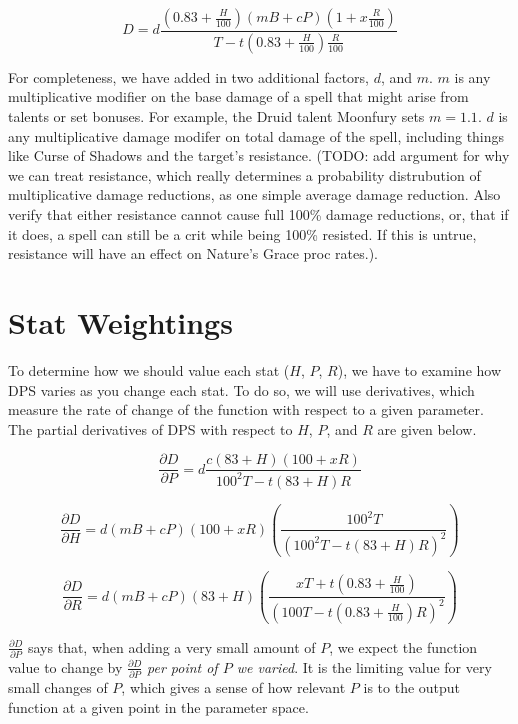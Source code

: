 \documentclass[letterpaper]{article}
\theoremstyle{definition}
\begin{document}
\begin{equation}
D = d\frac{\left(0.83 + \frac{H}{100}\right)\left(mB + cP\right)\left(1 + x\frac{R}{100}\right)}{T - t\left(0.83 + \frac{H}{100}\right)\frac{R}{100}}
\end{equation}

For completeness, we have added in two additional factors, $d$, and $m$. $m$ is any multiplicative modifier on the base damage of a spell that might arise from talents or set bonuses. For example, the Druid talent Moonfury sets $m=1.1$. $d$ is any multiplicative damage modifer on total damage of the spell, including things like Curse of Shadows and the target's resistance. (TODO: add argument for why we can treat resistance, which really determines a probability distrubution of multiplicative damage reductions, as one simple average damage reduction. Also verify that either resistance cannot cause full 100\% damage reductions, or, that if it does, a spell can still be a crit while being 100\% resisted. If this is untrue, resistance will have an effect on Nature's Grace proc rates.).

\section{Stat Weightings}
To determine how we should value each stat ($H$, $P$, $R$), we have to examine how DPS varies as you change each stat. To do so, we will use derivatives, which measure the rate of change of the function with respect to a given parameter. The partial derivatives of DPS with respect to $H$, $P$, and $R$ are given below.

\begin{equation}
\frac{\partial D}{\partial P} = d\frac{c\left(83+H\right)\left(100 + xR\right)}{100^2T - t(83 + H)R}
\end{equation}

\begin{equation}
\frac{\partial D}{\partial H} = d\left(mB + cP\right)\left(100+xR\right) \left(\frac{100^2T}{\left(100^2T - t\left(83+H\right)R\right)^2}\right)
\end{equation}

\begin{equation}
\frac{\partial D}{\partial R} = d\left(mB+cP\right)\left(83+H\right) \left(\frac{xT + t\left(0.83 + \frac{H}{100}\right)}{\left(100T - t\left(0.83 + \frac{H}{100}\right)R\right)^2}\right)
\end{equation}

$\frac{\partial D}{\partial P}$ says that, when adding a very small amount of $P$, we expect the function value to change by $\frac{\partial D}{\partial P}$ \textit{per point of $P$ we varied}. It is the limiting value for very small changes of $P$, which gives a sense of how relevant $P$ is to the output function at a given point in the parameter space.
\end{document}
